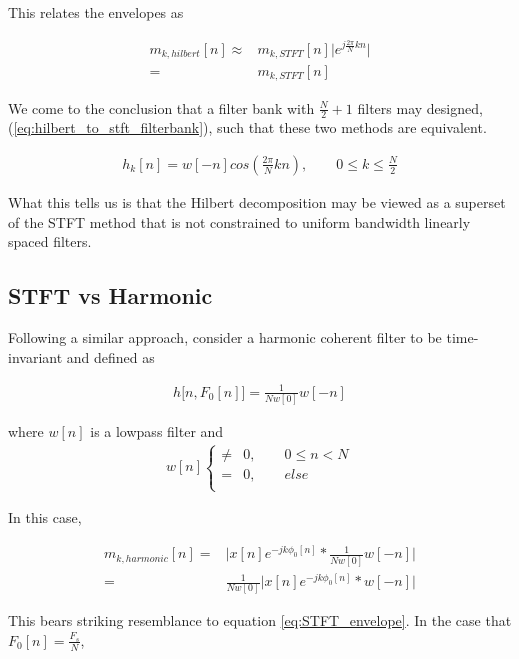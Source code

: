 \documentclass [11pt, proquest,oneside] {ganter_thesis}[2015/03/03]
\begin{document}
This relates the envelopes as 

\begin{align}
m_{k,hilbert}[n] \approx& m_{k,STFT}[n] \Big| e^{j\frac{2\pi}{N}kn} \Big| \nonumber \\
=& m_{k,STFT}[n]
\end{align}

We come to the conclusion that a filter bank with $\frac{N}{2} + 1$ filters may designed, (\ref{eq:hilbert_to_stft_filterbank}), such that these two methods are equivalent.

\begin{align}
\label{eq:hilbert_to_stft_filterbank}
h_k[n] = w[-n]cos(\frac{2\pi}{N}kn), \qquad 0 \leq k \leq \frac{N}{2}
\end{align}

What this tells us is that the Hilbert decomposition may be viewed as a superset of the STFT method that is not constrained to uniform bandwidth linearly spaced filters.

\subsection{STFT vs Harmonic}

Following a similar approach, consider a harmonic coherent filter to be time-invariant and defined as

\begin{align}
h\big[n, F_0[n] \big] = \frac{1}{Nw[0]} w[-n]
\end{align}

where $w[n]$ is a lowpass filter and 
\begin{align}
w[n] \left\{
                \begin{array}{ll}
                \neq& 0, \qquad 0 \leq n < N \nonumber \\
			   =& 0, \qquad else \\
                \end{array}
              \right.
\end{align}

In this case,

\begin{align}
m_{k,harmonic}[n] =& \Big| x[n] e^{-jk\phi_0 [n]} *  \frac{1}{Nw[0]} w[-n] \Big|  \nonumber \\
=& \frac{1}{Nw[0]} \Big| x[n] e^{-jk\phi_0 [n]} *  w[-n] \Big|
\end{align}

This bears striking resemblance to equation \ref{eq:STFT_envelope}.  In the case that $F_0[n] = \frac{F_s}{N}$,
\end{document}
